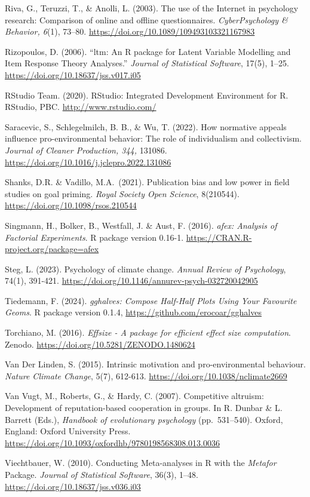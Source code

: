 \documentclass[
]{article}
\begin{document}
Riva, G., Teruzzi, T., \& Anolli, L. (2003). The use of the Internet in
psychology research: Comparison of online and offline questionnaires.
\emph{CyberPsychology \& Behavior, 6}(1), 73--80.
\url{https://doi.org/10.1089/109493103321167983}

Rizopoulos, D. (2006). ``ltm: An R package for Latent Variable Modelling
and Item Response Theory Analyses.'' \emph{Journal of Statistical
Software}, 17(5), 1--25. \url{https://doi.org/10.18637/jss.v017.i05}

RStudio Team. (2020). RStudio: Integrated Development Environment for R.
RStudio, PBC. \url{http://www.rstudio.com/}

Saracevic, S., Schlegelmilch, B. B., \& Wu, T. (2022). How normative
appeals influence pro-environmental behavior: The role of individualism
and collectivism. \emph{Journal of Cleaner Production, 344,} 131086.
\url{https://doi.org/10.1016/j.jclepro.2022.131086}

Shanks, D.R. \& Vadillo, M.A.~(2021). Publication bias and low power in
field studies on goal priming. \emph{Royal Society Open Science},
8(210544). \url{https://doi.org/10.1098/rsos.210544}

Singmann, H., Bolker, B., Westfall, J. \& Aust, F. (2016). \emph{afex:
Analysis of Factorial Experiments}. R package version 0.16-1.
\url{https://CRAN.R-project.org/package=afex}

Steg, L. (2023). Psychology of climate change. \emph{Annual Review of
Psychology}, 74(1), 391-421.
\url{https://doi.org/10.1146/annurev-psych-032720042905}

Tiedemann, F. (2024). \emph{gghalves: Compose Half-Half Plots Using Your
Favourite Geoms}. R package version 0.1.4,
\url{https://github.com/erocoar/gghalves}

Torchiano, M. (2016). \emph{Effsize - A package for efficient effect
size computation}. Zenodo. \url{https://doi.org/10.5281/ZENODO.1480624}

Van Der Linden, S. (2015). Intrinsic motivation and pro-environmental
behaviour. \emph{Nature Climate Change}, 5(7), 612-613.
\url{https://doi.org/10.1038/nclimate2669}

Van Vugt, M., Roberts, G., \& Hardy, C. (2007). Competitive altruism:
Development of reputation-based cooperation in groups. In R. Dunbar \&
L. Barrett (Eds.), \emph{Handbook of evolutionary psychology}
(pp.~531--540). Oxford, England: Oxford University Press.
\url{https://doi.org/10.1093/oxfordhb/9780198568308.013.0036}

Viechtbauer, W. (2010). Conducting Meta-analyses in R with the
\emph{Metafor} Package. \emph{Journal of Statistical Software}, 36(3),
1--48. \url{https://doi.org/10.18637/jss.v036.i03}
\end{document}
